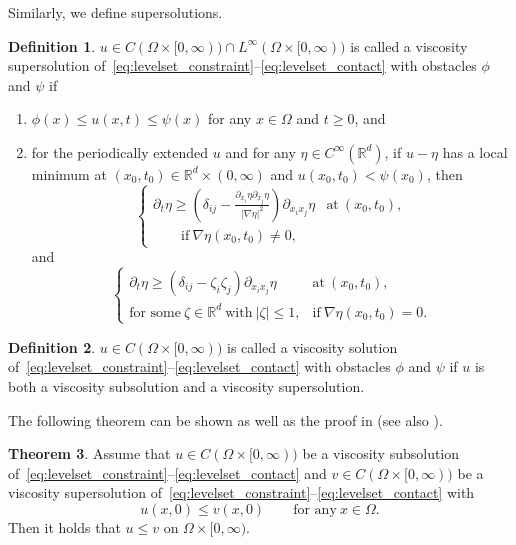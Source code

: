 \documentclass{amsart}
\theoremstyle{definition}
\newtheorem{definition}{Definition}[section]
\newtheorem{theorem}[definition]{Theorem}
\def\R{{\mathbb{R}}}
\begin{document}
Similarly, we define supersolutions.
\begin{definition}
    $u \in C (\Omega \times [0,\infty)) \cap L^\infty (\Omega \times [0,\infty))$
     is called a viscosity supersolution of~\eqref{eq:levelset_constraint}--\eqref{eq:levelset_contact}
with obstacles $\phi$ and $\psi$ if 
\begin{enumerate}
    \item[(i)] $\phi (x) \leq u (x,t) \leq \psi (x)$ for any $x \in \Omega$ and $t\geq 0$, and
    \item[(ii)] for the periodically extended $u$ and for any $\eta \in C^\infty (\R^d)$, if $u-\eta$ has a local minimum at $(x_0,t_0) \in \R^d \times (0,\infty)$ and $u(x_0,t_0) < \psi (x_0)$, then 
    \begin{equation*}
    \left\{ 
\begin{array}{ll}
\partial _t \eta \geq \left( 
\delta_{ij} -\frac{\partial_{x_i} \eta \partial _{x_j} \eta}{|\nabla \eta|^2} \right)
\partial_{x_i x_j}\eta & \text{at} \ (x_0,t_0), \\
\qquad \text{if} \ \nabla \eta (x_0,t_0)\not=0, &
\end{array} \right.
    \end{equation*}
and
    \begin{equation*}
    \left\{ 
\begin{array}{ll}
\partial _t \eta \geq \left( 
\delta_{ij} -\zeta _i \zeta_j \right)
\partial_{x_i x_j}\eta & \text{at} \ (x_0,t_0), \\
\text{for some} \ \zeta \in \R^d \ \text{with} \ |\zeta| \leq 1, & \text{if} \ \nabla \eta (x_0,t_0)=0.
\end{array} \right.
    \end{equation*}
\end{enumerate}
\end{definition}

\begin{definition}\label{def:viscositysol}
$u \in C(\Omega \times [0,\infty))$ is called a viscosity solution of~\eqref{eq:levelset_constraint}--\eqref{eq:levelset_contact} with obstacles $\phi$ and $\psi$ if $u$ is both a viscosity subsolution and a viscosity supersolution.
\end{definition}

The following theorem  can be shown as well as the proof in \cite[Theorem 3.2]{MR1100206} (see also \cite[Proposition 1]{Mercier}).
\begin{theorem}\label{thm4.4}
Assume that $u \in C(\Omega \times [0,\infty))$ be a viscosity subsolution of~\eqref{eq:levelset_constraint}--\eqref{eq:levelset_contact} and
$v \in C(\Omega \times [0,\infty))$ be a viscosity supersolution of~\eqref{eq:levelset_constraint}--\eqref{eq:levelset_contact}
with
\[
u(x,0) \leq v(x,0) \qquad \text{for any} \ x \in \Omega.
\]
Then it holds that $u\leq v$ on $\Omega \times [0,\infty)$.
\end{theorem}
\end{document}
